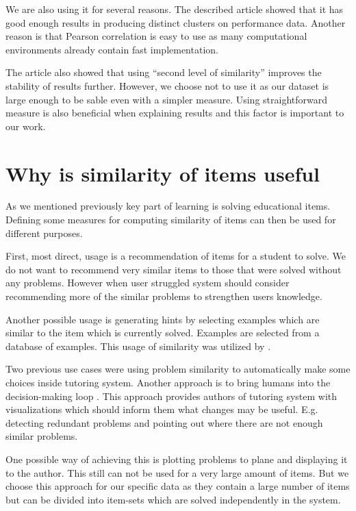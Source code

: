 \documentclass[
  digital, %
  table,   %
  nolof,     %
  nolot,     %
  nocover,
  color,
  final, %
]{fithesis3}
\begin{document}
We are also using it for several reasons. The described article showed that it has good enough results in producing distinct clusters on performance data. Another reason is that Pearson correlation is easy to use as many computational environments already contain fast implementation.

The article also showed that using ``second level of similarity'' improves the stability of results further. However, we choose not to use it as our dataset is large enough to be sable even with a simpler measure. Using straightforward measure is also beneficial when explaining results and this factor is important to our work.

\section{Why is similarity of items useful}\label{why-is-similarity-of-items-useful}


As we mentioned previously key part of learning is solving educational items. Defining some measures for computing similarity of items can then be used for different purposes.

First, most direct, usage is a recommendation of items for a student to solve. We do not want to recommend very similar items to those that were solved without any problems. However when user struggled system should consider recommending more of the similar problems to strengthen users knowledge.

Another possible usage is generating hints by selecting examples which are similar to the item which is currently solved. Examples are selected from a database of examples. This usage of similarity was utilized by \citeauthor{hosseini2017study}\cite{hosseini2017study}.

Two previous use cases were using problem similarity to automatically make some choices inside tutoring system. Another approach is to bring humans into the decision-making loop \cite{baker2016stupid}. This approach provides authors of tutoring system with visualizations which should inform them what changes may be useful. E.g. detecting redundant problems and pointing out where there are not enough similar problems.

One possible way of achieving this is plotting problems to plane and displaying it to the author. This still can not be used for a very large amount of items. But we choose this approach for our specific data as they contain a large number of items but can be divided into item-sets which are solved independently in the system.
\end{document}
